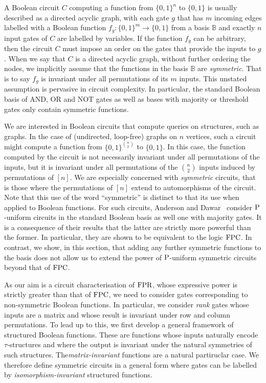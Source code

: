 \documentclass[../paper.tex]{subfiles}
\begin{document}


A Boolean circuit $C$ computing a function from $\{0,1\}^n$ to
$\{0,1\}$ is usually described as a directed acyclic graph, with each
gate $g$ that has $m$ incoming edges labelled with a Boolean function
$f_g : \{0,1\}^m \rightarrow \{0,1\}$ from a basis $\mathbb{B}$ and
exactly $n$ input gates of $C$ are labelled by variables.  If the
function $f_g$ can be arbitrary, then the circuit $C$ must impose an
order on the gates that provide the inputs to $g$.  When we say that
$C$ is a directed acyclic graph, without further ordering the nodes,
we implicitly assume that the functions in the basis $\mathbb{B}$ are
\emph{symmetric}.  That is to say $f_g$ is invariant under all
permutations of its $m$ inputs.  This unstated assumption is pervasive
in circuit complexity.  In particular, the standard Boolean basis of
AND, OR and NOT gates as well as bases with majority or threshold
gates only contain symmetric functions.

We are interested in Boolean circuits that compute queries on
structures, such as graphs.  In the case of (undirected, loop-free)
graphs on $n$ vertices, such a circuit might compute a function from
$\{0,1\}^{n \choose 2}$ to $\{0,1\}$.  In this case, the function
computed by the circuit is not necessarily invariant under all
permutations of the inputs, but it is invariant under all permutations
of the $n \choose 2$ inputs induced by permutations of $[n]$.
We are especially concerned with \emph{symmetric} circuits, that is
those where the permutations of $[n]$ extend to automorphisms of the
circuit.  Note that this use of the word ``symmetric'' is distinct to
that its use when applied to Boolean functions.  For such circuits, Anderson and Dawar~\cite{AndersonD17}
consider $\mathrm{P}$-uniform circuits in the standard Boolean basis as
well one with majority gates.  It is a consequence of their results
that the latter are strictly more powerful than the former.  In
particular, they are shown to be equivalent
to the logic $\text{\upshape FPC}$.  In contrast, we show, in this section, that adding any
further symmetric functions to the basis does not allow us to extend
the power of $\mathrm{P}$-uniform symmetric circuits beyond that of $\text{\upshape FPC}$.

As our aim is a circuit characterisation of $\text{\upshape FPR}$, whose expressive
power is strictly greater than that of $\text{\upshape FPC}$, we need to
consider gates corresponding to non-symmetric Boolean functions.  In
particular, we consider \emph{rank} gates whose inputs are a matrix
and whose result is invariant under row and column permutations.  To
lead up to this, we first develop a general framework of structured
Boolean functions.  These are functions whose inputs naturally encode
$\tau$-structures and where the output is invariant under the natural
symmetries of such structures.  The\emph{matrix-invariant} functions
are a natural partiruclar case.   We therefore define symmetric circuits in a
general form where gates can be labelled by \emph{isomorphism-invariant} structured
functions.
\end{document}
